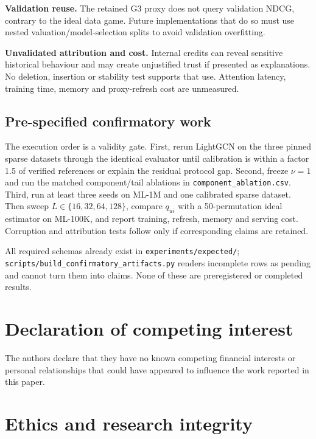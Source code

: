 \documentclass[a4paper,fleqn,longmktitle]{cas-dc}
\begin{document}
\textbf{Validation reuse.} The retained G3 proxy does not query validation
NDCG, contrary to the ideal data game. Future implementations that do so must
use nested valuation/model-selection splits to avoid validation overfitting.

\textbf{Unvalidated attribution and cost.} Internal credits can reveal
sensitive historical behaviour and may create unjustified trust if presented
as explanations. No deletion, insertion or stability test supports that use.
Attention latency, training time, memory and proxy-refresh cost are unmeasured.

\subsection{Pre-specified confirmatory work}
\label{sec:future}

The execution order is a validity gate. First, rerun LightGCN on the three
pinned sparse datasets through the identical evaluator until calibration is
within a factor 1.5 of verified references or explain the residual protocol
gap. Second, freeze $\nu=1$ and run the matched component/tail ablations in
\texttt{component\_ablation.csv}. Third, run at least three seeds on ML-1M and
one calibrated sparse dataset. Then sweep $L\in\{16,32,64,128\}$, compare
$q_{ui}$ with a 50-permutation ideal estimator on ML-100K, and report training,
refresh, memory and serving cost. Corruption and attribution tests follow only
if corresponding claims are retained.

All required schemas already exist in \texttt{experiments/expected/};
\texttt{scripts/build\_confirmatory\_artifacts.py} renders incomplete rows as
pending and cannot turn them into claims. None of these are preregistered or
completed results.

\printcredits

\section*{Declaration of competing interest}

The authors declare that they have no known competing financial interests or
personal relationships that could have appeared to influence the work reported
in this paper.

\section*{Ethics and research integrity}
\end{document}
